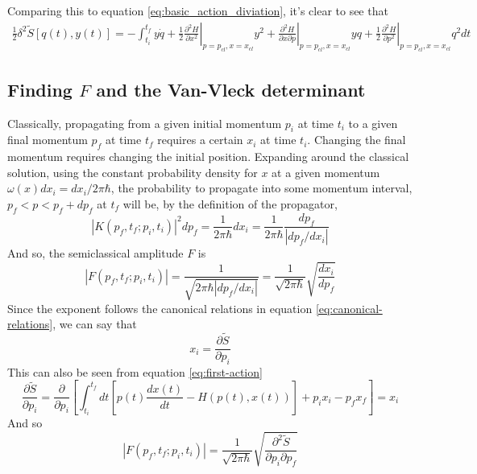 \documentclass{article}
\begin{document}
Comparing this to equation \ref{eq:basic_action_diviation}, it's clear to see that
\begin{equation}
\begin{gathered}
    \frac{1}{2}\delta^2\tilde{S}[q(t), y(t)] = - \int_{t_i}^{t_f}  y\dot{q} + \left.\frac{1}{2}\frac{\partial^2 H}{\partial x^2}\right|_{p=p_{cl}, x=x_{cl}}y^2
        +  \left.\frac{\partial^2 H}{\partial x\partial p}\right|_{p=p_{cl}, x=x_{cl}}yq
        +  \left.\frac{1}{2}\frac{\partial^2 H}{\partial p^2}\right|_{p=p_{cl}, x=x_{cl}}q^2dt
\end{gathered}
\end{equation}
\subsection{Finding $F$ and the Van-Vleck determinant}
Classically, propagating from a given initial momentum $p_i$ at time $t_i$ to a given final momentum $p_f$ at time $t_f$ requires a certain $x_i$ at time $t_i$. Changing the final momentum requires changing the initial position. Expanding around the classical solution, using the constant probability density for $x$ at a given momentum $\omega(x) dx_i = dx_i / 2\pi\hbar$, the probability to propagate into some momentum interval, $p_f < p < p_f + dp_f$ at $t_f$ will be, by the definition of the propagator,
\begin{equation}
    \left| K(p_f, t_f ; p_i, t_i)\right|^2dp_f = \frac{1}{2\pi\hbar} dx_i = \frac{1}{2\pi\hbar}\frac{dp_f}{\left|dp_f/dx_i\right|}
\end{equation}
And so, the semiclassical amplitude $F$ is
\begin{equation}
    \left|F(p_f, t_f; p_i, t_i)\right| = \frac{1}{\sqrt{2\pi\hbar\left|dp_f/dx_i\right|}} = \frac{1}{\sqrt{2\pi\hbar}}\sqrt{\frac{dx_i}{dp_f}}
\end{equation}
Since the exponent follows the canonical relations in equation \ref{eq:canonical-relations}, we can say that
\begin{equation}
    x_i = \frac{\partial \tilde{S}}{\partial p_i}
\end{equation}
This can also be seen from equation \ref{eq:first-action}
\begin{equation}
    \frac{\partial \tilde{S}}{\partial p_i} = 
    \frac{\partial}{\partial p_i} \left[\int_{t_i}^{t_f} dt \left[p(t) \frac{dx(t)}{dt} - H(p(t), x(t))\right] + p_ix_i - p_fx_f\right] = 
    x_i
\end{equation}
And so
\begin{equation}
    \left|F(p_f, t_f; p_i, t_i)\right| = \frac{1}{\sqrt{2\pi\hbar}}\sqrt{\frac{\partial^2 \tilde{S}}{\partial p_i\partial p_f}}
\end{equation}
\end{document}
